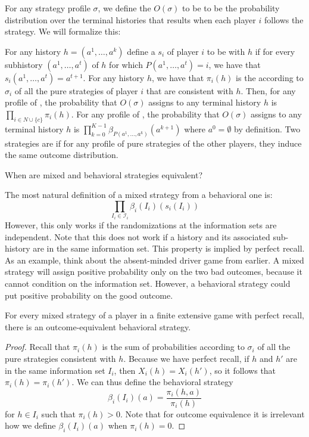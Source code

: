 \documentclass[10pt]{article}
\begin{document}
\begin{definition}
	For any strategy profile $\sigma$, we define the  $O(\sigma)$ to be to be the probability distribution over the terminal histories that results when each player $i$ follows the strategy. We will formalize this:
\end{definition}

\begin{definition}
	For any history $h = (a^1,\dots,a^k)$ define a  $s_i$ of player $i$ to be  with $h$ if for every subhistory $(a^1,\dots,a^t)$ of $h$ for which $P(a^1,\dots,a^t) = i$, we have that $s_i(a^1,\dots,a^t) = a^{t+1}$. For any history $h$, we have that $\pi_i(h)$ is the  according to $\sigma_i$ of all the pure strategies of player $i$ that are consistent with $h$. Then, for any profile of , the probability that $O(\sigma)$ assigns to any terminal history $h$ is $\prod_{i \in N \cup \{c\}} \pi_i(h)$. For any profile of , the probability that $O(\sigma)$ assigns to any terminal history $h$ is $\prod_{k=0}^{K-1} \beta_{P(a^1,\dots,a^k)}(a^{k+1})$ where $a^0 = \emptyset$ by definition. Two strategies are  if for any profile of pure strategies of the other players, they induce the same outcome distribution.
\end{definition}

\begin{question}
	When are mixed and behavioral strategies equivalent?
\end{question}

The most natural definition of a mixed strategy from a behavioral one is:\[\prod_{I_i\in\mathscr{I}_i} \beta_i(I_i) (s_i(I_i))\]However, this only works if the randomizations at the information sets are independent. Note that this does not work if a history and its associated sub-history are in the same information set. This property is implied by perfect recall. As an example, think about the absent-minded driver game from earlier. A mixed strategy will assign positive probability only on the two bad outcomes, because it cannot condition on the information set. However, a behavioral strategy could put positive probability on the good outcome. 


\begin{theorem}
	 For every mixed strategy of a player in a finite extensive game with perfect recall, there is an outcome-equivalent behavioral strategy.
\end{theorem}
\begin{proof}
	Recall that $\pi_i(h)$ is the sum of probabilities according to $\sigma_i$ of all the pure strategies consistent with $h$. Because we have perfect recall, if $h$ and $h'$ are in the same information set $I_i$, then $X_i(h) = X_i(h')$, so it follows that $\pi_i(h) = \pi_i(h')$. We can thus define the behavioral strategy \[\beta_i(I_i)(a) = \frac{\pi_i(h,a)}{\pi_i(h)}\]for $h \in I_i$ such that $\pi_i(h) > 0$. Note that for outcome equivalence it is irrelevant how we define $\beta_i(I_i)(a)$ when $\pi_i(h) = 0$.
\end{proof}
\end{document}

